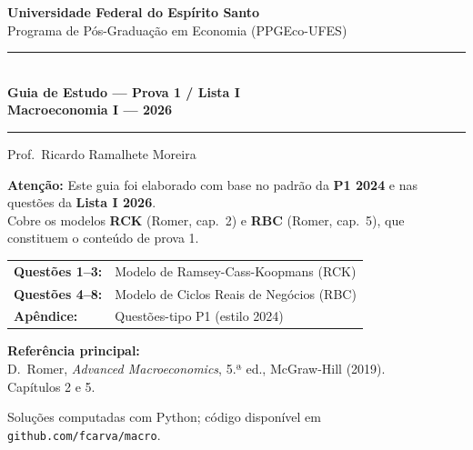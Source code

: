 \documentclass[12pt, a4paper]{article}
\begin{document}

\begin{titlepage}
\begin{center}
\vspace*{1.5cm}
{\Large\bfseries Universidade Federal do Espírito Santo}\\[0.5em]
{\large Programa de Pós-Graduação em Economia (PPGEco-UFES)}\\[2em]

\rule{\linewidth}{1.2pt}\\[0.8em]
{\LARGE\bfseries\color{cyanrbc} Guia de Estudo --- Prova 1 / Lista I\\[0.4em]
\large Macroeconomia I --- 2026}\\[0.8em]
\rule{\linewidth}{1.2pt}

\vspace{1em}
{\large Prof.\ Ricardo Ramalhete Moreira}

\vspace{1.5em}
\begin{tcolorbox}[standard, colback=provabg, colframe=provaborder, width=0.88\textwidth,
  arc=4pt, boxrule=1.2pt, left=8pt, right=8pt, top=6pt, bottom=6pt]
\centering
\textbf{\textcolor{provaborder}{Atenção:}} Este guia foi elaborado com base no
padrão da \textbf{P1 2024} e nas questões da \textbf{Lista I 2026}.\\[0.3em]
Cobre os modelos \textbf{RCK} (Romer, cap.\ 2) e \textbf{RBC} (Romer, cap.\ 5),
que constituem o conteúdo de prova 1.
\end{tcolorbox}

\vspace{1.5em}
\begin{tabular}{ll}
\textbf{Questões 1--3:} & Modelo de Ramsey-Cass-Koopmans (RCK) \\[0.4em]
\textbf{Questões 4--8:} & Modelo de Ciclos Reais de Negócios (RBC) \\[0.4em]
\textbf{Apêndice:} & Questões-tipo P1 (estilo 2024)
\end{tabular}

\vspace{1.5em}
\begin{tcolorbox}[standard, colback=boxbg, colframe=boxborder, width=0.88\textwidth,
  arc=4pt, boxrule=1pt, left=8pt, right=8pt, top=6pt, bottom=6pt]
\centering
\textbf{Referência principal:} \\[0.3em]
D.\ Romer, \textit{Advanced Macroeconomics}, 5.ª ed., McGraw-Hill (2019). \\
Capítulos 2 e 5.
\end{tcolorbox}

\vfill
{\small Soluções computadas com Python; código disponível em
\texttt{github.com/fcarva/macro}.}
\end{center}
\end{titlepage}
\end{document}
